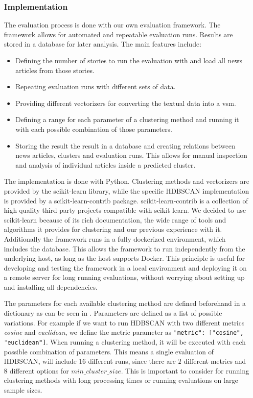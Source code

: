 \subsubsection{Implementation}
\label{subsubsec:4b_implementation}

The evaluation process is done with our own evaluation framework.
The framework allows for automated and repeatable evaluation runs.
Results are stored in a database for later analysis.
The main features include:

\begin{itemize}
    \item Defining the number of stories to run the evaluation with and load all news articles from those stories.
    \item Repeating evaluation runs with different sets of data.
    \item Providing different vectorizers for converting the textual data into a \gls{vsm}.
    \item Defining a range for each parameter of a clustering method
          and running it with each possible combination of those parameters.
    \item Storing the result the result in a database and creating relations between news articles,
          clusters and evaluation runs.
          This allows for manual inspection and analysis of individual articles inside a predicted cluster.
\end{itemize}

The implementation is done with Python.
Clustering methods and vectorizers are provided by the scikit-learn library\cite{scikit-learn},
while the specific HDBSCAN implementation is provided by a scikit-learn-contrib package\cite{McInnes2017}.
scikit-learn-contrib is a collection of high quality third-party projects compatible with scikit-learn.
We decided to use scikit-learn because of its rich documentation,
the wide range of tools and algorithms it provides for clustering and our previous experience with it.
Additionally the framework runs in a fully dockerized environment, which includes the database.
This allows the framework to run independently from the underlying host, as long as the host supports Docker.
This principle is useful for developing and testing the framework in a local environment
and deploying it on a remote server for long running evaluations,
without worrying about setting up and installing all dependencies.

The parameters for each available clustering method are defined beforehand in a dictionary
as can be seen in .
Parameters are defined as a list of possible variations.
For example if we want to run HDBSCAN with two different metrics \textit{cosine} and \textit{euclidean},
we define the metric parameter as \lstinline{"metric": ["cosine", "euclidean"]}.
When running a clustering method, it will be executed with each possible combination of parameters.
This means a single evaluation of HDBSCAN, will include 16 different runs,
since there are 2 different metrics and 8 different options for $min\_cluster\_size$.
This is important to consider for running clustering methods with long processing times
or running evaluations on large sample sizes.

